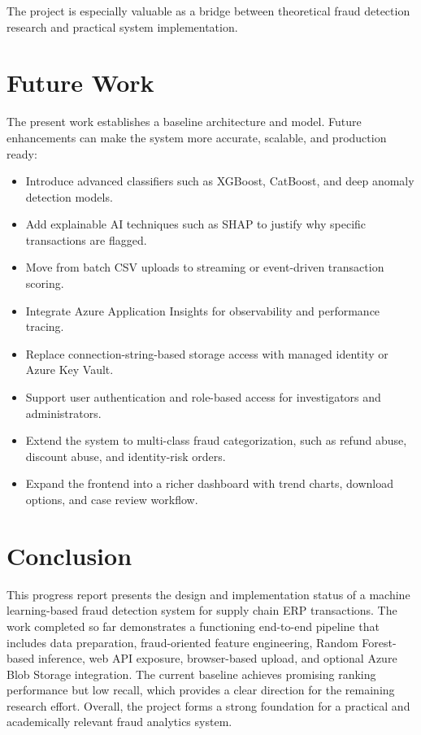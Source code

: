 \documentclass[a4paper,12pt]{article}
\begin{document}
The project is especially valuable as a bridge between theoretical fraud detection research and practical system implementation.

\section{Future Work}
The present work establishes a baseline architecture and model. Future enhancements can make the system more accurate, scalable, and production ready:
\begin{itemize}[noitemsep]
    \item Introduce advanced classifiers such as XGBoost, CatBoost, and deep anomaly detection models.
    \item Add explainable AI techniques such as SHAP to justify why specific transactions are flagged.
    \item Move from batch CSV uploads to streaming or event-driven transaction scoring.
    \item Integrate Azure Application Insights for observability and performance tracing.
    \item Replace connection-string-based storage access with managed identity or Azure Key Vault.
    \item Support user authentication and role-based access for investigators and administrators.
    \item Extend the system to multi-class fraud categorization, such as refund abuse, discount abuse, and identity-risk orders.
    \item Expand the frontend into a richer dashboard with trend charts, download options, and case review workflow.
\end{itemize}

\section{Conclusion}
This progress report presents the design and implementation status of a machine learning-based fraud detection system for supply chain ERP transactions. The work completed so far demonstrates a functioning end-to-end pipeline that includes data preparation, fraud-oriented feature engineering, Random Forest-based inference, web API exposure, browser-based upload, and optional Azure Blob Storage integration. The current baseline achieves promising ranking performance but low recall, which provides a clear direction for the remaining research effort. Overall, the project forms a strong foundation for a practical and academically relevant fraud analytics system.

\newpage


\end{document}
